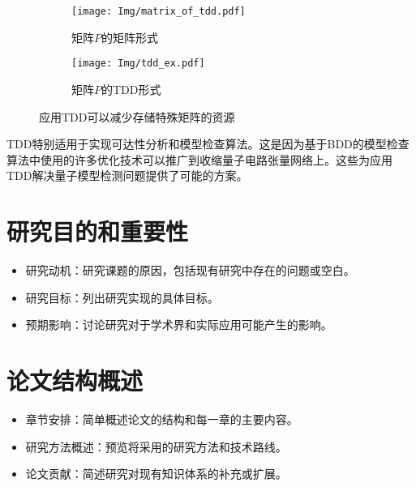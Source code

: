\begin{figure}[!htbp]
    \begin{subfigure}[c]{0.4\textwidth}
        \centering
        \texttt{[image: Img/matrix\_of\_tdd.pdf]}
        \caption{矩阵$P$的矩阵形式}
        \label{fig:mat_P}
    \end{subfigure}
    \begin{subfigure}[c]{0.4\textwidth}
        \centering
        \texttt{[image: Img/tdd\_ex.pdf]}
        \caption{矩阵$P$的TDD形式}
        \label{fig:tdd_P}
    \end{subfigure}
    \caption{应用TDD可以减少存储特殊矩阵的资源}
    \label{fig:P}
\end{figure}

TDD特别适用于实现可达性分析和模型检查算法。这是因为基于BDD的模型检查算法中使用的许多优化技术可以推广到收缩量子电路张量网络上\citep{Chaki_2018}。这些为应用TDD解决量子模型检测问题提供了可能的方案。

\section{研究目的和重要性}
\begin{itemize}
  \item 研究动机：研究课题的原因，包括现有研究中存在的问题或空白。
  \item 研究目标：列出研究实现的具体目标。
  \item 预期影响：讨论研究对于学术界和实际应用可能产生的影响。
\end{itemize}

\section{论文结构概述}
\begin{itemize}
  \item 章节安排：简单概述论文的结构和每一章的主要内容。
  \item 研究方法概述：预览将采用的研究方法和技术路线。
  \item 论文贡献：简述研究对现有知识体系的补充或扩展。
\end{itemize}
